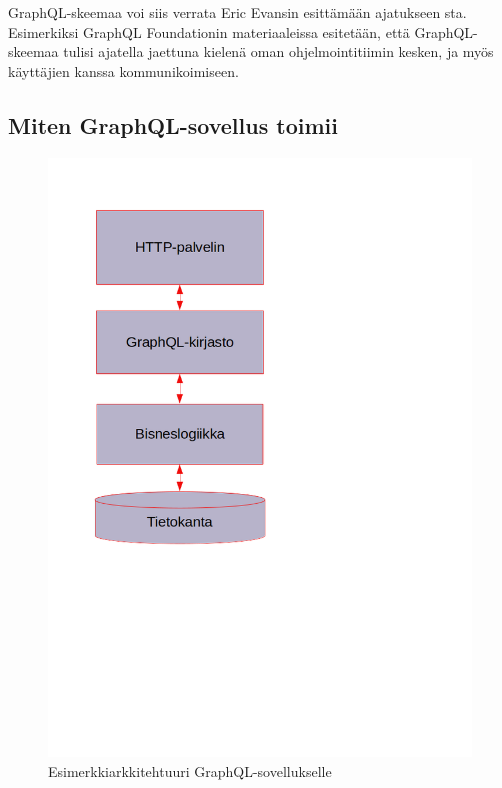 GraphQL-skeemaa voi siis verrata Eric Evansin esittämään ajatukseen
sta. Esimerkiksi GraphQL Foundationin
materiaaleissa esitetään, että GraphQL-skeemaa tulisi ajatella jaettuna
kielenä oman ohjelmointitiimin kesken, ja myös käyttäjien kanssa
kommunikoimiseen.\cite{thinkingInGraphs}

\hypertarget{miten-graphql-sovellus-toimii}{%
\subsection{Miten GraphQL-sovellus
toimii}\label{miten-graphql-sovellus-toimii}}

\begin{figure}
\centering
\includegraphics[width=\textwidth,height=0.5\textheight]{illustration/GraphQL-arkkitehtuuri.png}
\caption{\label{graphqlarkkitehtuuri} Esimerkkiarkkitehtuuri
GraphQL-sovellukselle}
\end{figure}

